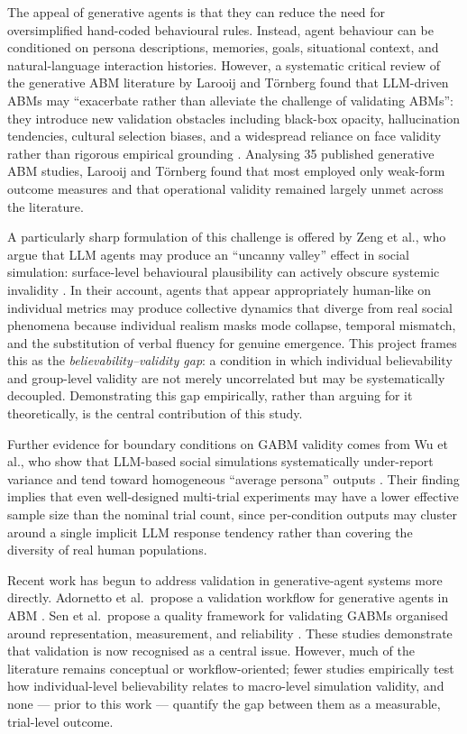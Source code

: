 \documentclass[11pt]{article}
\begin{document}
The appeal of generative agents is that they can reduce the need for oversimplified
hand-coded behavioural rules. Instead, agent behaviour can be conditioned on persona
descriptions, memories, goals, situational context, and natural-language interaction
histories. However, a systematic critical review of the generative ABM literature by
Larooij and T\"{o}rnberg found that LLM-driven ABMs may ``exacerbate rather than alleviate
the challenge of validating ABMs'': they introduce new validation obstacles including
black-box opacity, hallucination tendencies, cultural selection biases, and a widespread
reliance on face validity rather than rigorous empirical grounding \cite{larooij2025critical}.
Analysing 35 published generative ABM studies, Larooij and T\"{o}rnberg found that most
employed only weak-form outcome measures and that operational validity remained largely unmet
across the literature.

A particularly sharp formulation of this challenge is offered by Zeng et al., who argue that
LLM agents may produce an ``uncanny valley'' effect in social simulation: surface-level
behavioural plausibility can actively obscure systemic invalidity \cite{zeng2026uncanny}.
In their account, agents that appear appropriately human-like on individual metrics may
produce collective dynamics that diverge from real social phenomena because individual
realism masks mode collapse, temporal mismatch, and the substitution of verbal fluency for
genuine emergence. This project frames this as the \emph{believability--validity gap}: a condition in
which individual believability and group-level validity are not merely uncorrelated but may
be systematically decoupled. Demonstrating this gap empirically, rather than arguing for it
theoretically, is the central contribution of this study.

Further evidence for boundary conditions on GABM validity comes from Wu et al., who show
that LLM-based social simulations systematically under-report variance and tend toward
homogeneous ``average persona'' outputs \cite{wu2026boundary}. Their finding implies that
even well-designed multi-trial experiments may have a lower effective sample size than the
nominal trial count, since per-condition outputs may cluster around a single implicit LLM
response tendency rather than covering the diversity of real human populations.

Recent work has begun to address validation in generative-agent systems more directly.
Adornetto et al.\ propose a validation workflow for generative agents in ABM \cite{adornetto2025overview}.
Sen et al.\ propose a quality framework for validating GABMs organised around representation,
measurement, and reliability \cite{sen2025validating}. These studies demonstrate that validation
is now recognised as a central issue. However, much of the literature remains conceptual or
workflow-oriented; fewer studies empirically test how individual-level believability relates
to macro-level simulation validity, and none --- prior to this work --- quantify the gap
between them as a measurable, trial-level outcome.
\end{document}
